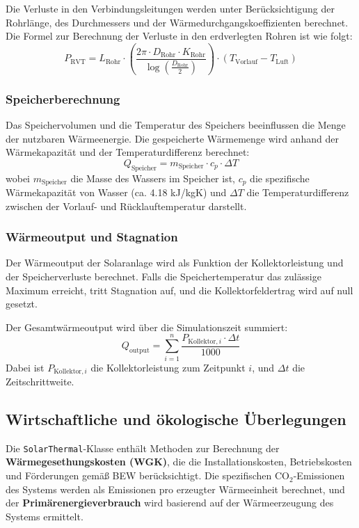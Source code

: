 Die Verluste in den Verbindungsleitungen werden unter Berücksichtigung der Rohrlänge, des Durchmessers und der Wärmedurchgangskoeffizienten berechnet. Die Formel zur Berechnung der Verluste in den erdverlegten Rohren ist wie folgt:
\[
P_{\text{RVT}} = L_{\text{Rohr}} \cdot \left( \frac{2 \pi \cdot D_{\text{Rohr}} \cdot K_{\text{Rohr}}}{\log\left( \frac{D_{\text{Rohr}}}{2} \right)} \right) \cdot (T_{\text{Vorlauf}} - T_{\text{Luft}})
\]

\subsubsection{Speicherberechnung}

Das Speichervolumen und die Temperatur des Speichers beeinflussen die Menge der nutzbaren Wärmeenergie. Die gespeicherte Wärmemenge wird anhand der Wärmekapazität und der Temperaturdifferenz berechnet:
\[
Q_{\text{Speicher}} = m_{\text{Speicher}} \cdot c_p \cdot \Delta T
\]
wobei \( m_{\text{Speicher}} \) die Masse des Wassers im Speicher ist, \( c_p \) die spezifische Wärmekapazität von Wasser (ca. 4.18 kJ/kgK) und \( \Delta T \) die Temperaturdifferenz zwischen der Vorlauf- und Rücklauftemperatur darstellt.

\subsubsection{Wärmeoutput und Stagnation}

Der Wärmeoutput der Solaranlage wird als Funktion der Kollektorleistung und der Speicherverluste berechnet. Falls die Speichertemperatur das zulässige Maximum erreicht, tritt Stagnation auf, und die Kollektorfeldertrag wird auf null gesetzt.

Der Gesamtwärmeoutput wird über die Simulationszeit summiert:
\[
Q_{\text{output}} = \sum_{i=1}^{n} \frac{P_{\text{Kollektor},i} \cdot \Delta t}{1000}
\]
Dabei ist \( P_{\text{Kollektor},i} \) die Kollektorleistung zum Zeitpunkt \( i \), und \( \Delta t \) die Zeitschrittweite.

\subsection{Wirtschaftliche und ökologische Überlegungen}
Die \texttt{SolarThermal}-Klasse enthält Methoden zur Berechnung der \textbf{Wärmegesethungskosten (WGK)}, die die Installationskosten, Betriebskosten und Förderungen gemäß BEW berücksichtigt. Die spezifischen CO$_2$-Emissionen des Systems werden als Emissionen pro erzeugter Wärmeeinheit berechnet, und der \textbf{Primärenergieverbrauch} wird basierend auf der Wärmeerzeugung des Systems ermittelt.

